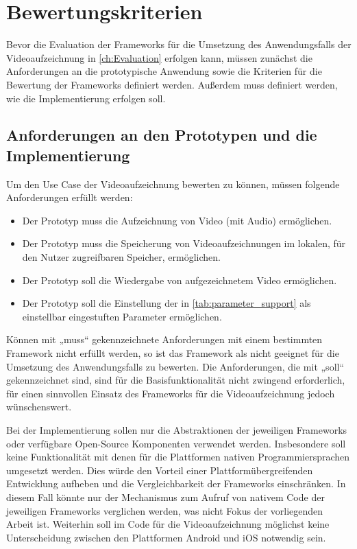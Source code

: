 \chapter{Bewertungskriterien}
\label{ch:Bewertungskriterien}

Bevor die Evaluation der Frameworks für die Umsetzung des Anwendungsfalls der Videoaufzeichnung in \autoref{ch:Evaluation} erfolgen kann, müssen zunächst die Anforderungen an die prototypische Anwendung sowie die Kriterien für die Bewertung der Frameworks definiert werden. 
Außerdem muss definiert werden, wie die Implementierung erfolgen soll.

\section{Anforderungen an den Prototypen und die Implementierung}
\label{sec:anforderungen}
Um den Use Case der Videoaufzeichnung bewerten zu können, müssen folgende Anforderungen erfüllt werden:
\begin{itemize}
  \item Der Prototyp muss die Aufzeichnung von Video (mit Audio) ermöglichen.
  \item Der Prototyp muss die Speicherung von Videoaufzeichnungen im lokalen, für den Nutzer zugreifbaren Speicher, ermöglichen.
  \item Der Prototyp soll die Wiedergabe von aufgezeichnetem Video ermöglichen.
  \item Der Prototyp soll die Einstellung der in \autoref{tab:parameter_support} als einstellbar eingestuften Parameter ermöglichen.
\end{itemize}

Können mit „muss“ gekennzeichnete Anforderungen mit einem bestimmten Framework nicht erfüllt werden, so ist das Framework als nicht geeignet für die Umsetzung des Anwendungsfalls zu bewerten.
Die Anforderungen, die mit „soll“ gekennzeichnet sind, sind für die Basisfunktionalität nicht zwingend erforderlich, für einen sinnvollen Einsatz des Frameworks für die Videoaufzeichnung jedoch wünschenswert.

Bei der Implementierung sollen nur die Abstraktionen der jeweiligen Frameworks oder verfügbare Open-Source Komponenten verwendet werden.
Insbesondere soll keine Funktionalität mit denen für die Plattformen nativen Programmiersprachen umgesetzt werden.
Dies würde den Vorteil einer Plattformübergreifenden Entwicklung aufheben und die Vergleichbarkeit der Frameworks einschränken.
In diesem Fall könnte nur der Mechanismus zum Aufruf von nativem Code der jeweiligen Frameworks verglichen werden, was nicht Fokus der vorliegenden Arbeit ist.
Weiterhin soll im Code für die Videoaufzeichnung möglichst keine Unterscheidung zwischen den Plattformen Android und iOS notwendig sein.


